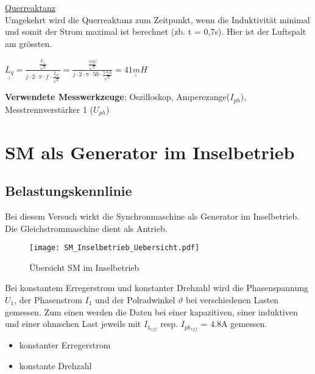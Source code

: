 \begin{flushleft}
\newpage




\underline{Querreaktanz}\\
\vspace{0.2cm}
Umgekehrt wird die Querreaktanz zum Zeitpunkt, wenn die Induktivität minimal und somit der Strom maximal ist berechnet (zb. t = 0,7s). Hier ist der Luftspalt am grössten.

\begin{center}
\begin{Large}
$ \underline{\underline{L_q}}= \frac{\frac{\hat{U}_1}{\sqrt{2}}}{j \cdot 2 \cdot \pi \cdot f \cdot \frac{\hat{I}_{ph}}{\sqrt{2}} }  = \frac{\frac{75 V}{\sqrt{2}}}{j \cdot 2 \cdot \pi \cdot 50 \cdot \frac{5.8 A}{\sqrt{2}} } = \underline{\underline{41 mH}}$\\
\end{Large}
\end{center}


\vspace{0.4cm}
\textbf{Verwendete Messwerkzeuge}:  Oszilloskop, Amperezange($I_{ph}$),\\ Messtrennverstärker 1 ($U_{ph}$) 


\newpage
\section{SM als Generator im Inselbetrieb}
\subsection{Belastungskennlinie}
Bei diesem Versuch wirkt die Synchronmaschine als Generator im Inselbetrieb. Die Gleichstrommaschine dient als Antrieb.
\vspace{0.3cm}
\begin{figure}[H]
    \centering
        \texttt{[image: SM\_Inselbetrieb\_Uebersicht.pdf]}
    \caption{Übersicht SM im Inselbetrieb}
    \label{fig:abb1}
\end{figure}
\vspace{0.3cm}
Bei konstantem  Erregerstrom und konstanter Drehzahl wird die Phasenspannung $U_1$, der Phasenstrom $I_1$ und der Polradwinkel $\vartheta$ bei verschiedenen Lasten gemessen. Zum einen werden die Daten bei einer kapazitiven, einer induktiven und einer ohmschen Last jeweils mit $I_{1_{eff}}$ resp. $I_{ph_{eff}}$ = 4.8A gemessen.

\begin{itemize}
\item {}            konstanter Erregerstrom
\item {}				konstante Drehzahl
\end{itemize}
\newpage



\end{flushleft}
